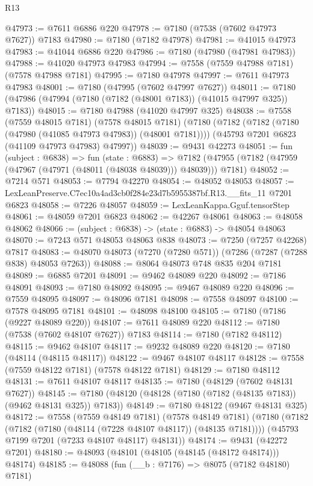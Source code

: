 \begin{lexlean}{R13}
\begin{coremodule}
@47973 := @7611 @6886 @220
@47978 := @7180 (@7538 (@7602 @47973 @7627)) @7183
@47980 := @7180 (@7182 @47978)
@47981 := @41015 @47973
@47983 := @41044 @6886 @220
@47986 := @7180 (@47980 (@47981 @47983))
@47988 := @41020 @47973 @47983
@47994 := @7558 (@7559 @47988 @7181) (@7578 @47988 @7181)
@47995 := @7180 @47978
@47997 := @7611 @47973 @47983
@48001 := @7180 (@47995 (@7602 @47997 @7627))
@48011 := @7180 (@47986 (@47994 (@7180 (@7182 (@48001 @7183)) (@41015 @47997 @325)) @7183))
@48015 := @7180 @47988 (@41020 @47997 @325)
@48038 := @7558
    (@7559 @48015 @7181)
    (@7578 @48015 @7181)
    (@7180
      (@7182 (@7182 (@7180 (@47980 (@41085 @47973 @47983)) (@48001 @7181))))
      (@45793 @7201 @6823 (@41109 @47973 @47983) @47997))
@48039 := @9431 @42273
@48051 := fun (subject : @6838) =>
  fun (state : @6883) =>
  @7182 (@47955 (@7182 (@47959 (@47967 (@47971 (@48011 (@48038 @48039))) @48039))) @7181)
@48052 := @7214 @571
@48053 := @7794 @42270
@48054 := @48052 @48053
@48057 := LexLeanPreserve.C7ec10a4ad3cb0f284e23d7b5955387bf.R13.__fits_11 @7201 @6823
@48058 := @7226 @48057
@48059 := LexLeanKappa.Gguf.tensorStep
@48061 := @48059 @7201 @6823
@48062 := @42267 @48061
@48063 := @48058 @48062
@48066 := (subject : @6838) -> (state : @6883) -> @48054 @48063
@48070 := @7243 @571 @48053 @48063 @838
@48073 := @7250 (@7257 @42268) @7817
@48083 := @48070 @48073 (@7270 (@7280 @571)) (@7286 (@7287 (@7288 @838) @48053 @7263))
@48088 := @8064 @48073 @748 @835 @204 @7181
@48089 := @6885 @7201
@48091 := @9462 @48089 @220
@48092 := @7186 @48091
@48093 := @7180 @48092
@48095 := @9467 @48089 @220
@48096 := @7559 @48095
@48097 := @48096 @7181
@48098 := @7558 @48097
@48100 := @7578 @48095 @7181
@48101 := @48098 @48100
@48105 := @7180 (@7186 (@9227 @48089 @220))
@48107 := @7611 @48089 @220
@48112 := @7180 (@7538 (@7602 @48107 @7627)) @7183
@48114 := @7180 (@7182 @48112)
@48115 := @9462 @48107
@48117 := @9232 @48089 @220
@48120 := @7180 (@48114 (@48115 @48117))
@48122 := @9467 @48107 @48117
@48128 := @7558 (@7559 @48122 @7181) (@7578 @48122 @7181)
@48129 := @7180 @48112
@48131 := @7611 @48107 @48117
@48135 := @7180 (@48129 (@7602 @48131 @7627))
@48145 := @7180 (@48120 (@48128 (@7180 (@7182 (@48135 @7183)) (@9462 @48131 @325)) @7183))
@48149 := @7180 @48122 (@9467 @48131 @325)
@48172 := @7558
    (@7559 @48149 @7181)
    (@7578 @48149 @7181)
    (@7180
      (@7182 (@7182 (@7180 (@48114 (@7228 @48107 @48117)) (@48135 @7181))))
      (@45793 @7199 @7201 (@7233 @48107 @48117) @48131))
@48174 := @9431 (@42272 @7201)
@48180 := @48093 (@48101 (@48105 (@48145 (@48172 @48174))) @48174)
@48185 := @48088 (fun (__b : @7176) => @8075 (@7182 @48180) @7181)

\end{coremodule}
\end{lexlean}
